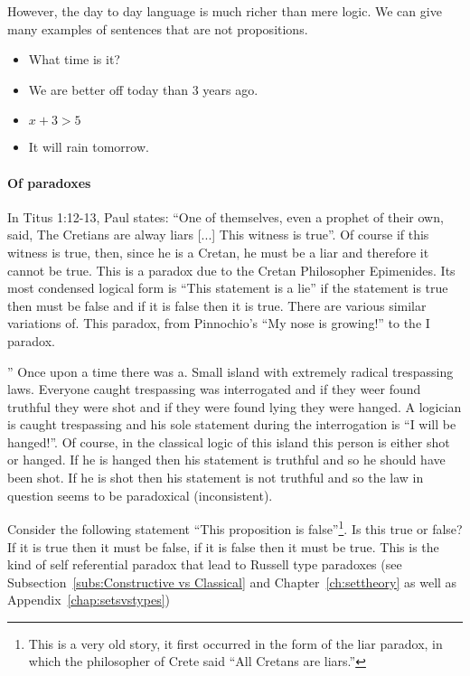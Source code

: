 However, the day to day language is much richer than mere logic. We can give  many examples of sentences that are not propositions. 

\begin{itemize}

\item What time is it?
\item  We are better off today than 3 years ago.
\item $x+3>5$
\item It will rain tomorrow.

\end{itemize}

\paragraph{\bf Of paradoxes }
In Titus 1:12-13, Paul states:
``One of themselves, even a prophet of their own, said, The Cretians are alway liars [...] This witness is true''. Of course if this witness is true, then, since he is a Cretan, he must be a liar and therefore it cannot be true. This is a paradox due to the Cretan Philosopher  Epimenides. Its most condensed logical form is ``This statement is a lie'' if the statement is true then must be false and if it is false then it is true. There are various similar variations of. This paradox, from Pinnochio's ``My nose is growing!'' to the I paradox.

'' Once upon a time there was a. Small island with extremely radical trespassing laws. Everyone caught trespassing was interrogated and if they weer found truthful they were shot and if they were found lying they were hanged. A logician is caught trespassing and his sole statement during  the interrogation is ``I will be hanged!''. Of course, in the classical logic of this island this person is either shot or hanged. If he is hanged then his statement is truthful and so he should have been shot. If he is shot then his statement is not truthful and so  the law in question seems to be paradoxical (inconsistent).




Consider the following statement ``This proposition is false''\footnote{This is a very old story, it first occurred in the form of the liar paradox, in which the philosopher of Crete said ``All Cretans are liars.''}. Is this true or false? If it is true then it must be false, if it is false then it must be true. This is the kind of self referential paradox that lead to Russell type paradoxes (see Subsection~\ref{subs:Constructive vs Classical} and 
 Chapter~\ref{ch:settheory} as well as Appendix~\ref{chap:setsvstypes})


